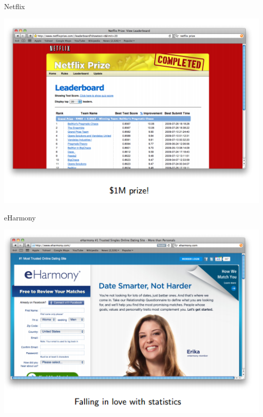 \documentclass{beamer}
\begin{document}
\begin{frame}{Netflix}
    \begin{center}
        \includegraphics[scale=0.5]{netflix.png}
    \end{center}
\end{frame}
\begin{frame}{eHarmony}
    \begin{center}
        \includegraphics[scale=0.5]{eHarmony.png}
    \end{center}
\end{frame}
\end{document}
